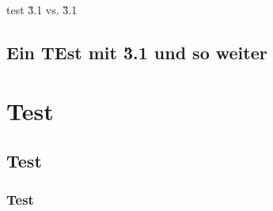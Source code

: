 \documentclass[series=CorpusAvesticum,gitver=true,PhD=false,tocdepth=subfivesection]{brill}
\begin{document}
\startwordcount
\tableofcontents
\mainmatter
%
test \H{3.1} vs. \G{3.1}

\chapter{Ein TEst mit \G{3.1} und so weiter}





%
%
%
%

\part{Test}
\chapter{Test}

\section{Test}
\end{document}
